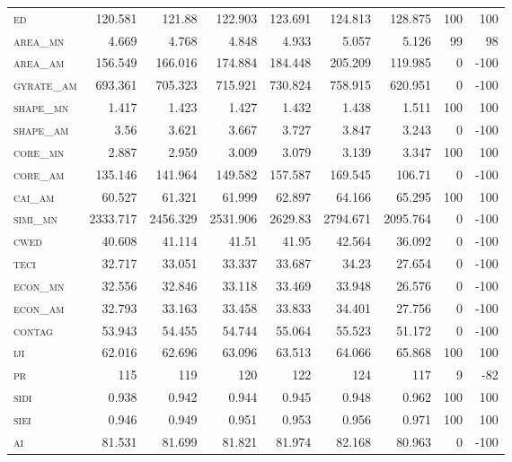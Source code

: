\begin{landscape}
\begin{table}[]
\begin{tabular}{@{}lrrrrr|rrr@{}}
\textsc{ed        } & 120.581  & 121.88   & 122.903  & 123.691  & 124.813  & 128.875  & 100 & 100  \\
\textsc{area\_mn  } & 4.669    & 4.768    & 4.848    & 4.933    & 5.057    & 5.126    & 99  & 98   \\
\textsc{area\_am  } & 156.549  & 166.016  & 174.884  & 184.448  & 205.209  & 119.985  & 0   & -100 \\
\textsc{gyrate\_am} & 693.361  & 705.323  & 715.921  & 730.824  & 758.915  & 620.951  & 0   & -100 \\
\textsc{shape\_mn } & 1.417    & 1.423    & 1.427    & 1.432    & 1.438    & 1.511    & 100 & 100  \\
\textsc{shape\_am } & 3.56     & 3.621    & 3.667    & 3.727    & 3.847    & 3.243    & 0   & -100 \\
\textsc{core\_mn  } & 2.887    & 2.959    & 3.009    & 3.079    & 3.139    & 3.347    & 100 & 100  \\
\textsc{core\_am  } & 135.146  & 141.964  & 149.582  & 157.587  & 169.545  & 106.71   & 0   & -100 \\
\textsc{cai\_am   } & 60.527   & 61.321   & 61.999   & 62.897   & 64.166   & 65.295   & 100 & 100  \\
\textsc{simi\_mn  } & 2333.717 & 2456.329 & 2531.906 & 2629.83  & 2794.671 & 2095.764 & 0   & -100 \\
\textsc{cwed      } & 40.608   & 41.114   & 41.51    & 41.95    & 42.564   & 36.092   & 0   & -100 \\
\textsc{teci      } & 32.717   & 33.051   & 33.337   & 33.687   & 34.23    & 27.654   & 0   & -100 \\
\textsc{econ\_mn  } & 32.556   & 32.846   & 33.118   & 33.469   & 33.948   & 26.576   & 0   & -100 \\
\textsc{econ\_am  } & 32.793   & 33.163   & 33.458   & 33.833   & 34.401   & 27.756   & 0   & -100 \\
\textsc{contag    } & 53.943   & 54.455   & 54.744   & 55.064   & 55.523   & 51.172   & 0   & -100 \\
\textsc{iji       } & 62.016   & 62.696   & 63.096   & 63.513   & 64.066   & 65.868   & 100 & 100  \\
\textsc{pr        } & 115      & 119      & 120      & 122      & 124      & 117      & 9   & -82  \\
\textsc{sidi      } & 0.938    & 0.942    & 0.944    & 0.945    & 0.948    & 0.962    & 100 & 100  \\
\textsc{siei      } & 0.946    & 0.949    & 0.951    & 0.953    & 0.956    & 0.971    & 100 & 100  \\
\textsc{ai        } & 81.531   & 81.699   & 81.821   & 81.974   & 82.168   & 80.963   & 0   & -100 \\ \bottomrule
\end{tabular}
\end{table}
\end{landscape}